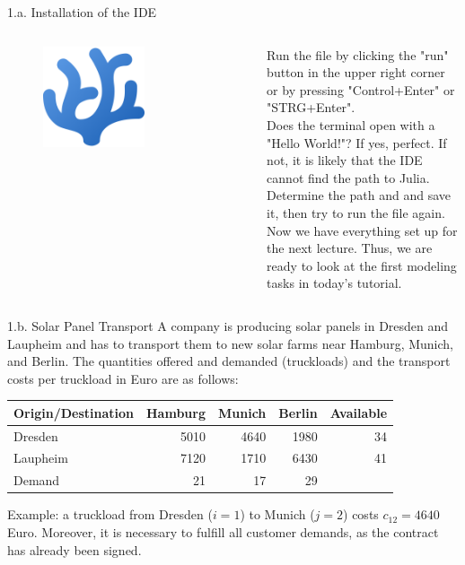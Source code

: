 \documentclass[aspectratio=1610,12pt]{beamer}
\begin{document}
\begin{frame}[fragile]{1.a. Installation of the IDE}
	\begin{columns}[onlytextwidth]
    	\center
    		\begin{figure}
    			\includegraphics[width=0.6\textwidth]{images/codium_cnl.png}
       		\end{figure}
    		Run the file by clicking the "run" button in the upper right corner or by pressing "Control+Enter" or "STRG+Enter". \\
    		\vspace{0.2cm}
    		Does the terminal open with a "Hello World!"? If yes, perfect. If not, it is likely that the IDE cannot find the path to Julia. Determine the path and and save it, then try to run the file again.\\
    		\vspace{0.2cm}
    		Now we have everything set up for the next lecture. Thus, we are ready to look at the first modeling tasks in today's tutorial.
    		\vspace{0.1cm}	
    \end{columns}
\end{frame}

\begin{frame}{1.b. Solar Panel Transport}
A company is producing solar panels in Dresden and Laupheim and has to transport them to new solar farms near Hamburg, Munich, and Berlin. The quantities offered and demanded (truckloads) and the transport costs per truckload in Euro are as follows:
\begin{center}
\begin{tabular}{l|rrr|r}
\hline
Origin/Destination     & Hamburg & Munich & Berlin & Available\\
\hline
Dresden    &  5010     &  4640     &  1980   & 34\\
Laupheim   &  7120     &  1710     &  6430   & 41\\                      
\hline
Demand     &    21     &   17      &    29   &\\
\hline      
\end{tabular}
\end{center}
Example: a truckload from Dresden ($i=1$) to Munich ($j=2$) costs $c_{12}=4640$ Euro. Moreover, it is necessary to fulfill all customer demands, as the contract has already been signed.
\end{frame}
\end{document}
